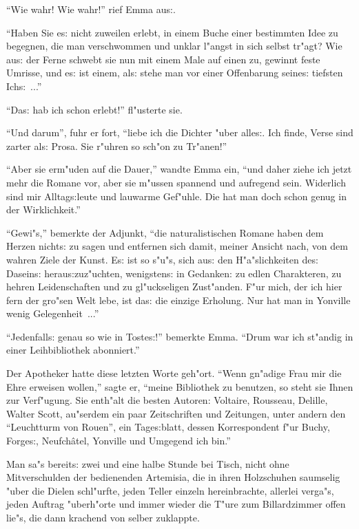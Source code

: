 \documentclass[oneside,12pt]{book}
\newcommand{\s}{s:}%
\begin{document}
"`Wie wahr! Wie wahr!"' rief Emma au{\s}.

"`Haben Sie e{\s} nicht zuweilen erlebt, in einem Buche einer
bestimmten Idee zu begegnen, die man verschwommen und unklar
l"angst in sich selbst tr"agt? Wie au{\s} der Ferne schwebt sie
nun mit einem Male auf einen zu, gewinnt feste Umrisse, und e{\s}
ist einem, al{\s} stehe man vor einer Offenbarung seine{\s}
tiefsten Ich{\s}~..."'

"`Da{\s} hab ich schon erlebt!"' fl"usterte sie.

"`Und darum"', fuhr er fort, "`liebe ich die Dichter "uber
alle{\s}. Ich finde, Verse sind zarter al{\s} Prosa. Sie r"uhren
so sch"on zu Tr"anen!"'

"`Aber sie erm"uden auf die Dauer,"' wandte Emma ein, "`und daher
ziehe ich jetzt mehr die Romane vor, aber sie m"ussen spannend und
aufregend sein. Widerlich sind mir Alltag{\s}leute und lauwarme
Gef"uhle. Die hat man doch schon genug in der Wirklichkeit."'

"`Gewi"s,"' bemerkte der Adjunkt, "`die naturalistischen Romane
haben dem Herzen nicht{\s} zu sagen und entfernen sich damit,
meiner Ansicht nach, von dem wahren Ziele der Kunst. E{\s} ist so
s"u"s, sich au{\s} den H"a"slichkeiten de{\s} Dasein{\s}
herau{\s}zuz"uchten, wenigsten{\s} in Gedanken: zu edlen
Charakteren, zu hehren Leidenschaften und zu gl"uckseligen
Zust"anden. F"ur mich, der ich hier fern der gro"sen Welt lebe,
ist da{\s} die einzige Erholung. Nur hat man in Yonville wenig
Gelegenheit~..."'

"`Jedenfall{\s} genau so wie in Toste{\s}!"' bemerkte Emma. "`Drum
war ich st"andig in einer Leihbibliothek abonniert."'

Der Apotheker hatte diese letzten Worte geh"ort. "`Wenn gn"adige
Frau mir die Ehre erweisen wollen,"' sagte er, "`meine Bibliothek
zu benutzen, so steht sie Ihnen zur Verf"ugung. Sie enth"alt die
besten Autoren: Voltaire, Rousseau, Delille, Walter Scott,
au"serdem ein paar Zeitschriften und Zeitungen, unter andern den
"`Leuchtturm von Rouen"', ein Tage{\s}blatt, dessen Korrespondent
f"ur Buchy, Forge{\s}, Neufch\^atel, Yonville und Umgegend ich
bin."'

Man sa"s bereit{\s} zwei und eine halbe Stunde bei Tisch, nicht
ohne Mitverschulden der bedienenden Artemisia, die in ihren
Holzschuhen saumselig "uber die Dielen schl"urfte, jeden Teller
einzeln hereinbrachte, allerlei verga"s, jeden Auftrag "uberh"orte
und immer wieder die T"ure zum Billardzimmer offen lie"s, die dann
krachend von selber zuklappte.
\end{document}
